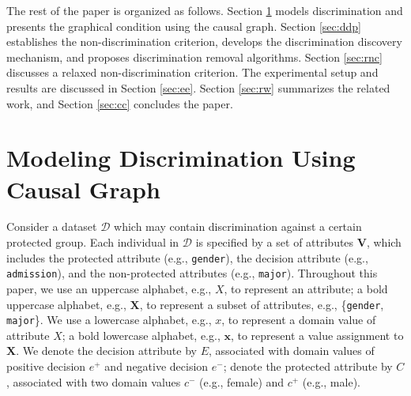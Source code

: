 \documentclass[twoside,leqno,twocolumn]{article}
\begin{document}
The rest of the paper is organized as follows. Section \ref{sec:md} models discrimination and presents the graphical condition using the causal graph. Section \ref{sec:ddp} establishes the non-discrimination criterion, develops the discrimination discovery mechanism, and proposes discrimination removal algorithms. Section \ref{sec:rnc} discusses a relaxed non-discrimination criterion. The experimental setup and results are discussed in Section \ref{sec:ee}. Section \ref{sec:rw} summarizes the related work, and Section \ref{sec:cc} concludes the paper.

\section{Modeling Discrimination Using Causal Graph}\label{sec:md}
Consider a dataset $\mathcal{D}$ which may contain discrimination against a certain protected group. Each individual in $\mathcal{D}$ is specified by a set of attributes $\mathbf{V}$, which includes the protected attribute (e.g., \texttt{gender}), the decision attribute (e.g., \texttt{admission}), and the non-protected attributes (e.g., \texttt{major}). Throughout this paper, we use an uppercase alphabet, e.g., $X$, to represent an attribute; a bold uppercase alphabet, e.g., $\mathbf{X}$, to represent a subset of attributes, e.g., \{\texttt{gender}, \texttt{major}\}. We use a lowercase alphabet, e.g., $x$, to represent a domain value of attribute $X$; a bold lowercase alphabet, e.g., $\mathbf{x}$, to represent a value assignment to $\mathbf{X}$. We denote the decision attribute by $E$, associated with domain values of positive decision $e^{+}$ and negative decision $e^{-}$; denote the protected attribute by $C$, associated with two domain values $c^{-}$ (e.g., female) and $c^{+}$ (e.g., male). %
 
\end{document}

